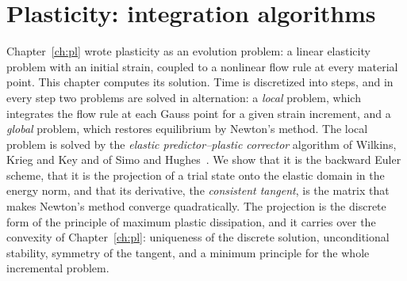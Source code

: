\chapter{Plasticity: integration algorithms}\label{ch:pl-num}

Chapter~\ref{ch:pl} wrote plasticity as an evolution problem: a linear
elasticity problem with an initial strain, coupled to a nonlinear flow rule at
every material point. This chapter computes its solution. Time is discretized
into steps, and in every step two problems are solved in alternation: a
\emph{local} problem, which integrates the flow rule at each Gauss point for a
given strain increment, and a \emph{global} problem, which restores equilibrium
by Newton's method. The local problem is solved by the
\emph{elastic predictor--plastic corrector} algorithm of Wilkins, Krieg and
Key and of Simo and Hughes~\cite{Wilkins1964,KriegKey1976,SimoHughesCI}. We show that
it is the backward Euler scheme, that it is the projection of a trial state
onto the elastic domain in the energy norm, and that its derivative, the
\emph{consistent tangent}, is the matrix that makes Newton's method converge
quadratically. The projection is the discrete form of the principle of maximum
plastic dissipation, and it carries over the convexity of Chapter~\ref{ch:pl}:
uniqueness of the discrete solution, unconditional stability, symmetry of the
tangent, and a minimum principle for the whole incremental problem.

